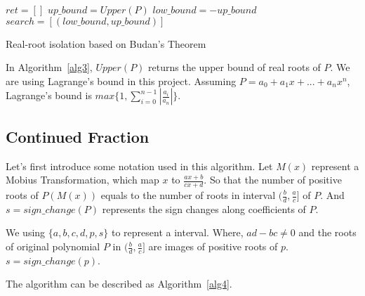 \begin{algorithm}[H]
\label{alg3}
\SetAlgoLined


  $ret = []$\;
  $up\_bound = Upper(P)$\;
  $low\_bound = - up\_bound$\;
  $search = [(low\_bound, up\_bound)]$\;


  \;
\caption{Real-root isolation based on Budan's Theorem}
\end{algorithm}

In Algorithm~\ref{alg3}, $Upper(P)$ returns the upper bound of real roots of
$P$. We are using Lagrange's bound in this project. Assuming $P = a_0 + a_1x +
... + a_nx^n$, Lagrange's bound is $max\{1,
\sum_{i=0}^{n-1}|\frac{a_i}{a_n}|\}$.

\subsection{Continued Fraction}

Let's first introduce some notation used in this algorithm. Let $M(x)$ represent a
Mobius Transformation, which map $x$ to $\frac{ax+b}{cx+d}$. So that the number
of positive
roots of $P(M(x))$ equals to the number of roots in interval $(\frac{b}{d},
\frac{a}{c}]$ of $P$. And $s = sign\_change(P)$ represents the sign changes along
coefficients of $P$.

We using $\{a,b,c,d,p, s\}$ to represent a interval. Where, $ad-bc \neq 0$ and
the roots of original polynomial $P$ in $(\frac{b}{d},\frac{a}{c}]$ are images
of positive roots of $p$. $s = sign\_change(p)$.

The algorithm can be described as Algorithm~\ref{alg4}. 


